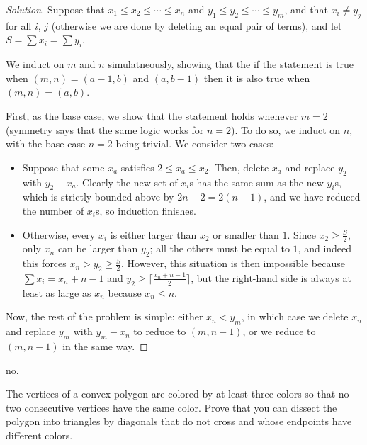 \documentclass[11pt]{scrartcl}
\providecommand{\ii}{\item}
\newenvironment{soln}{\begin{proof}[Solution]}{\end{proof}}
\begin{document}
\begin{soln}
	Suppose that $x_1 \le x_2 \le \cdots \le x_n$ and
	$y_1 \le y_2 \le \cdots \le y_m$, and that $x_i \ne y_j$
	for all $i$, $j$ (otherwise we are done by deleting an equal pair of terms),
	and let $S = \sum x_i = \sum y_i$.
	
	We induct on $m$ and $n$ simulatneously,
	showing that the if the statement is true when $(m, n) = (a-1, b)$
	and $(a, b-1)$ then it is also true when $(m, n) = (a, b)$.
	
	First, as the base case, we show that the statement holds
	whenever $m = 2$ (symmetry says that the same logic works for $n=2$).
	To do so, we induct on $n$, with the base case $n = 2$ being trivial.
	We consider two cases:
	\begin{itemize}
		\ii Suppose that some $x_a$ satisfies $2\le x_a \le x_2$.
		Then, delete $x_a$ and replace $y_2$ with $y_2 - x_a$.
		Clearly the new set of $x_i$s has the same sum as the new $y_i$s,
		which is strictly bounded above by $2n - 2 = 2(n - 1)$,
		and we have reduced the number of $x_i$s, so induction finishes.
		\ii Otherwise, every $x_i$ is either larger than $x_2$
		or smaller than $1$. Since $x_2 \ge \frac S2$,
		only $x_n$ can be larger than $y_2$; all the others must be
		equal to $1$, and indeed this forces $x_n > y_2 \ge \frac S2$.
		However, this situation is then impossible
		because $\sum x_i = x_n + n-1$ and
		$y_2 \ge \lceil\frac{x_n + n-1}{2}\rceil$,
		but the right-hand side is always at least as large as $x_n$
		because $x_n\le n$.
	\end{itemize}

	Now, the rest of the problem is simple:
	either $x_n < y_m$, in which case we delete $x_n$
	and replace $y_m$ with $y_m - x_n$ to reduce to $(m, n-1)$,
	or we reduce to $(m, n-1)$ in the same way.
\end{soln}

\begin{problem}
	no.
\end{problem}

\begin{problem}
	The vertices of a convex polygon are colored by at least three colors
	so that no two consecutive vertices have the same color.
	Prove that you can dissect the polygon into triangles by diagonals
	that do not cross and whose endpoints have different colors.
\end{problem}
\end{document}
